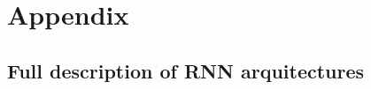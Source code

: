 \newpage
\section{Appendix}\label{sec:appendix}


\onecolumngrid
\subsection{Full description of RNN arquitectures}
